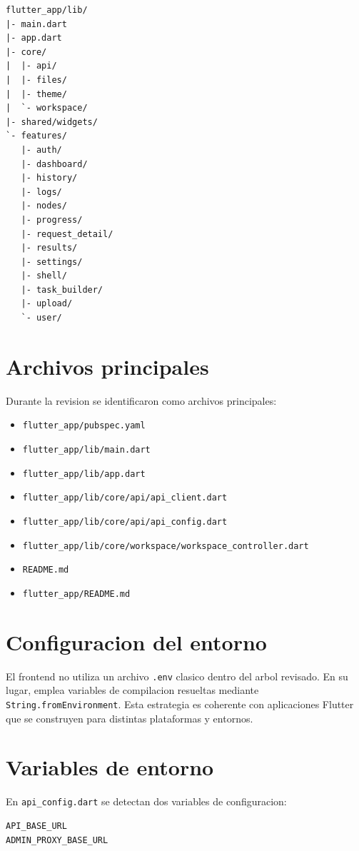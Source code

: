 \documentclass[conference]{IEEEtran}
\begin{document}
\begin{lstlisting}
flutter_app/lib/
|- main.dart
|- app.dart
|- core/
|  |- api/
|  |- files/
|  |- theme/
|  `- workspace/
|- shared/widgets/
`- features/
   |- auth/
   |- dashboard/
   |- history/
   |- logs/
   |- nodes/
   |- progress/
   |- request_detail/
   |- results/
   |- settings/
   |- shell/
   |- task_builder/
   |- upload/
   `- user/
\end{lstlisting}

\section{Archivos principales}
Durante la revision se identificaron como archivos principales:

\begin{itemize}[leftmargin=*]
\item \texttt{flutter\_app/pubspec.yaml}
\item \texttt{flutter\_app/lib/main.dart}
\item \texttt{flutter\_app/lib/app.dart}
\item \texttt{flutter\_app/lib/core/api/api\_client.dart}
\item \texttt{flutter\_app/lib/core/api/api\_config.dart}
\item \texttt{flutter\_app/lib/core/workspace/workspace\_controller.dart}
\item \texttt{README.md}
\item \texttt{flutter\_app/README.md}
\end{itemize}

\section{Configuracion del entorno}
El frontend no utiliza un archivo \texttt{.env} clasico dentro del arbol revisado. En su lugar, emplea variables de compilacion resueltas mediante \texttt{String.fromEnvironment}. Esta estrategia es coherente con aplicaciones Flutter que se construyen para distintas plataformas y entornos.

\section{Variables de entorno}
En \texttt{api\_config.dart} se detectan dos variables de configuracion:

\begin{lstlisting}
API_BASE_URL
ADMIN_PROXY_BASE_URL
\end{lstlisting}
\end{document}
